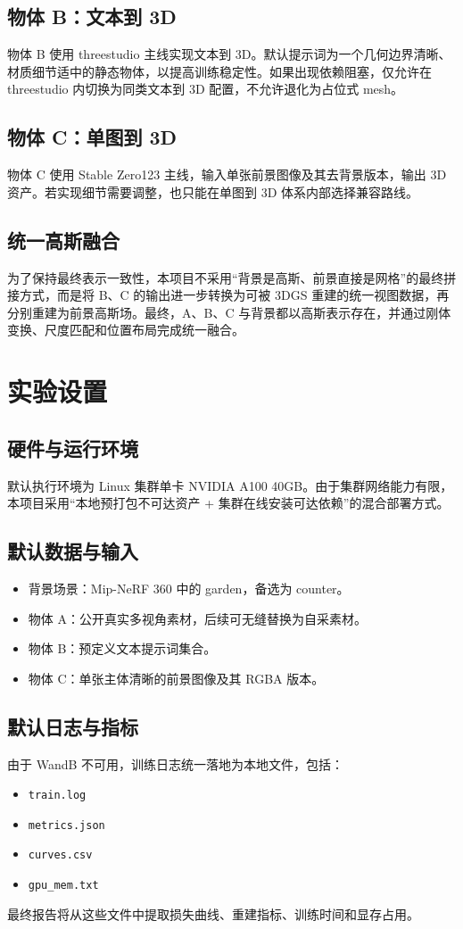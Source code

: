 \documentclass{article}
\begin{document}
\subsection{物体 B：文本到 3D}
物体 B 使用 threestudio 主线实现文本到 3D。默认提示词为一个几何边界清晰、材质细节适中的静态物体，以提高训练稳定性。如果出现依赖阻塞，仅允许在 threestudio 内切换为同类文本到 3D 配置，不允许退化为占位式 mesh。

\subsection{物体 C：单图到 3D}
物体 C 使用 Stable Zero123 主线，输入单张前景图像及其去背景版本，输出 3D 资产。若实现细节需要调整，也只能在单图到 3D 体系内部选择兼容路线。

\subsection{统一高斯融合}
为了保持最终表示一致性，本项目不采用“背景是高斯、前景直接是网格”的最终拼接方式，而是将 B、C 的输出进一步转换为可被 3DGS 重建的统一视图数据，再分别重建为前景高斯场。最终，A、B、C 与背景都以高斯表示存在，并通过刚体变换、尺度匹配和位置布局完成统一融合。

\section{实验设置}
\subsection{硬件与运行环境}
默认执行环境为 Linux 集群单卡 NVIDIA A100 40GB。由于集群网络能力有限，本项目采用“本地预打包不可达资产 + 集群在线安装可达依赖”的混合部署方式。

\subsection{默认数据与输入}
\begin{itemize}
  \item 背景场景：Mip-NeRF 360 中的 garden，备选为 counter。
  \item 物体 A：公开真实多视角素材，后续可无缝替换为自采素材。
  \item 物体 B：预定义文本提示词集合。
  \item 物体 C：单张主体清晰的前景图像及其 RGBA 版本。
\end{itemize}

\subsection{默认日志与指标}
由于 WandB 不可用，训练日志统一落地为本地文件，包括：
\begin{itemize}
  \item \texttt{train.log}
  \item \texttt{metrics.json}
  \item \texttt{curves.csv}
  \item \texttt{gpu\_mem.txt}
\end{itemize}
最终报告将从这些文件中提取损失曲线、重建指标、训练时间和显存占用。
\end{document}
